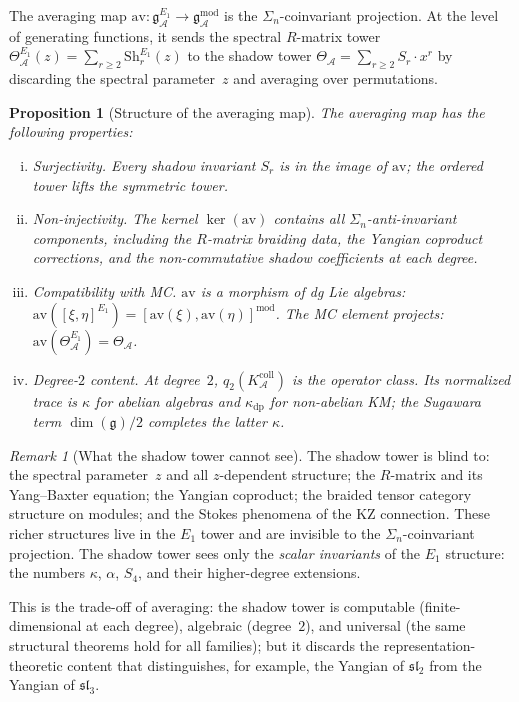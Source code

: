 \documentclass[11pt,reqno]{amsart}
\newtheorem{proposition}[theorem]{Proposition}
\theoremstyle{definition}
\theoremstyle{remark}
\newtheorem{remark}[theorem]{Remark}
\newcommand{\cA}{\mathcal{A}}
\newcommand{\Sh}{\mathrm{Sh}}
\newcommand{\fg}{\mathfrak{g}}
\numberwithin{equation}{section}
\begin{document}
The averaging map $\mathrm{av}\colon
\mathfrak{g}^{E_1}_\cA \to
\mathfrak{g}^{\mathrm{mod}}_\cA$ is the
$\Sigma_n$-coinvariant projection. At the level of
generating functions, it sends the spectral $R$-matrix
tower
$\Theta_\cA^{E_1}(z) = \sum_{r \ge 2} \Sh_r^{E_1}(z)$
to the shadow tower
$\Theta_\cA = \sum_{r \ge 2} S_r \cdot x^r$ by discarding
the spectral parameter~$z$ and averaging over permutations.

\begin{proposition}[Structure of the averaging
map]\label{prop:av-structure}
The averaging map has the following properties:
\begin{enumerate}[(i)]
\item \emph{Surjectivity.}\enspace
 Every shadow invariant $S_r$ is in the image of
 $\mathrm{av}$; the ordered tower lifts the symmetric tower.

\item \emph{Non-injectivity.}\enspace
 The kernel $\ker(\mathrm{av})$ contains all
 $\Sigma_n$-anti-invariant components, including the
 $R$-matrix braiding data, the Yangian coproduct corrections,
 and the non-commutative shadow coefficients at each degree.

\item \emph{Compatibility with MC.}\enspace
 $\mathrm{av}$ is a morphism of dg Lie algebras:
 $\mathrm{av}([\xi,\eta]^{E_1})
 = [\mathrm{av}(\xi), \mathrm{av}(\eta)]^{\mathrm{mod}}$.
 The MC element projects:
 $\mathrm{av}(\Theta_\cA^{E_1}) = \Theta_\cA$.

\item \emph{Degree-$2$ content.}\enspace
 At degree~$2$, $q_2(K_\cA^{\mathrm{coll}})$ is the operator class.
 Its normalized trace is $\kappa$ for abelian algebras and
 $\kappa_{\mathrm{dp}}$ for non-abelian KM; the Sugawara term
 $\dim(\fg)/2$ completes the latter $\kappa$.
\end{enumerate}
\end{proposition}

\begin{remark}[What the shadow tower
cannot see]\label{rem:shadow-blind}
The shadow tower is blind to: the spectral parameter~$z$ and
all $z$-dependent structure; the $R$-matrix and its Yang--Baxter
equation; the Yangian coproduct; the braided tensor category
structure on modules; and the Stokes phenomena of the
KZ connection. These richer structures live in the $E_1$
tower and are invisible to the $\Sigma_n$-coinvariant
projection. The shadow tower sees only the
\emph{scalar invariants} of the $E_1$ structure: the
numbers $\kappa$, $\alpha$, $S_4$, and their higher-degree
extensions.

This is the trade-off of averaging: the shadow tower is
computable (finite-dimensional at each degree), algebraic
(degree~$2$), and universal (the same structural theorems
hold for all families); but it discards the
representation-theoretic content that distinguishes, for
example, the Yangian of $\mathfrak{sl}_2$ from the Yangian
of $\mathfrak{sl}_3$.
\end{remark}
\end{document}
